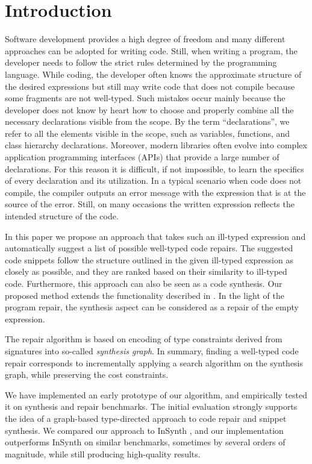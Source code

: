 \section{Introduction}
\label{sec:intro}


Software development provides a high degree of freedom and many
different approaches can be adopted for writing code. Still, when
writing a program, the developer needs to follow the strict rules
determined by the programming language. While coding, the developer
often knows the approximate structure of the desired expressions but
still may write code that does not compile because some fragments are
not well-typed. Such mistakes occur mainly because the developer does
not know by heart how to choose and properly combine all the
necessary declarations visible from the scope. By the term
``declarations'', we refer to all the elements visible in the scope,
such as variables, functions, and class hierarchy
declarations. Moreover, modern libraries often evolve into complex
application programming interfaces (APIs) that provide a large number
of declarations. For this reason it is difficult, if not impossible,
to learn the specifics of every declaration and its utilization. In a
typical scenario when code does not compile, the compiler outputs an
error message with the expression that is at the source of the error.
Still, on many occasions the written expression reflects the intended
structure of the code.

In this paper we propose an approach that takes such an ill-typed
expression and automatically suggest a list of possible well-typed
code repairs. The suggested code snippets follow the structure
outlined in the given ill-typed expression as closely as possible, and
they are ranked based on their similarity to ill-typed
code. Furthermore, this approach can also be seen as a code
synthesis. Our proposed method extends the functionality described in
\cite{MandelinetALL2005Jungloid,
  GveroETAL13CompleteCompletionTypesWeights, PerelmanGBG12}. In the
light of the program repair, the synthesis aspect can be considered as
a repair of the empty expression.

The repair algorithm is based on encoding of type constraints derived
from signatures into so-called {\emph {synthesis graph}}. In summary,
finding a well-typed code repair corresponds to incrementally applying
a search algorithm on the synthesis graph, while preserving the cost
constraints.

We have implemented an early prototype of our algorithm, and
empirically tested it on synthesis and repair benchmarks. The initial
evaluation strongly supports the idea of a graph-based type-directed
approach to code repair and snippet synthesis. We compared our
approach to InSynth \cite{GveroETAL13CompleteCompletionTypesWeights},
and our implementation outperforms InSynth on similar benchmarks,
sometimes by several orders of magnitude, while still producing
high-quality results.





